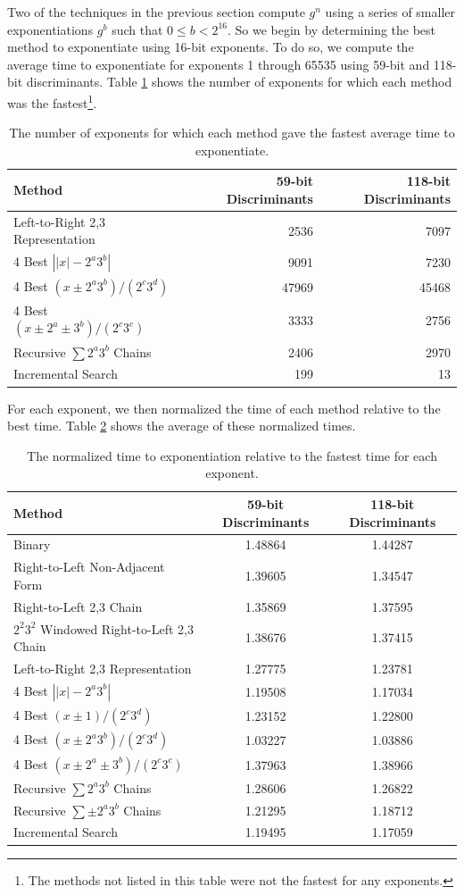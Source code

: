 \documentclass{ucalgthes1}
\theoremstyle{definition}
\begin{document}
Two of the techniques in the previous section compute $g^n$ using a series of smaller exponentiations $g^b$ such that $0 \le b < 2^{16}$.  So we begin by determining the best method to exponentiate using 16-bit exponents.  To do so, we compute the average time to exponentiate for exponents 1 through 65535 using 59-bit and 118-bit discriminants.  Table \ref{tab:exp16bitWinners} shows the number of exponents for which each method was the fastest\footnote{The methods not listed in this table were not the fastest for any exponents.}.
\begin{table}[h]
\centering
\begin{tabular}{| l | r | r |}
	\hline
	Method & 59-bit Discriminants & 118-bit Discriminants \\
	\hline
	Left-to-Right 2,3 Representation & 2536 & 7097 \\
	4 Best $\left||x|-2^a3^b\right|$ & 9091 & 7230 \\
	4 Best $(x \pm 2^a3^b)/(2^c3^d)$ & 47969 & 45468 \\
	4 Best $(x \pm 2^a \pm 3^b)/(2^c3^c)$ & 3333 & 2756 \\
	Recursive $\sum 2^a3^b$ Chains & 2406 & 2970 \\
	Incremental Search & 199 & 13 \\
	\hline
\end{tabular}
\caption{The number of exponents for which each method gave the fastest average time to exponentiate.}
\label{tab:exp16bitWinners}
\end{table}
For each exponent, we then normalized the time of each method relative to the best time.  Table \ref{tab:exp16bitTimes} shows the average of these normalized times.
\begin{table}[h]
\centering
\begin{tabular}{| l | c | c |}
	\hline
	Method & 59-bit Discriminants & 118-bit Discriminants \\
	\hline
	Binary & 1.48864 & 1.44287 \\
	Right-to-Left Non-Adjacent Form & 1.39605 & 1.34547 \\
	Right-to-Left 2,3 Chain & 1.35869 & 1.37595 \\
	$2^2 3^2$ Windowed Right-to-Left 2,3 Chain & 1.38676 & 1.37415 \\
	Left-to-Right 2,3 Representation & 1.27775 & 1.23781 \\
	4 Best $\left||x|-2^a3^b\right|$ & 1.19508 & 1.17034 \\
	4 Best $(x \pm 1)/(2^c3^d)$ & 1.23152 & 1.22800 \\
	4 Best $(x \pm 2^a3^b)/(2^c3^d)$ & 1.03227 & 1.03886 \\
	4 Best $(x \pm 2^a \pm 3^b)/(2^c3^c)$ & 1.37963 & 1.38966 \\
	Recursive $\sum 2^a3^b$ Chains & 1.28606 & 1.26822 \\
	Recursive $\sum \pm 2^a3^b$ Chains & 1.21295 & 1.18712 \\
	Incremental Search & 1.19495 & 1.17059 \\
	\hline
\end{tabular}
\caption{The normalized time to exponentiation relative to the fastest time for each exponent.}
\label{tab:exp16bitTimes}
\end{table}
\end{document}
